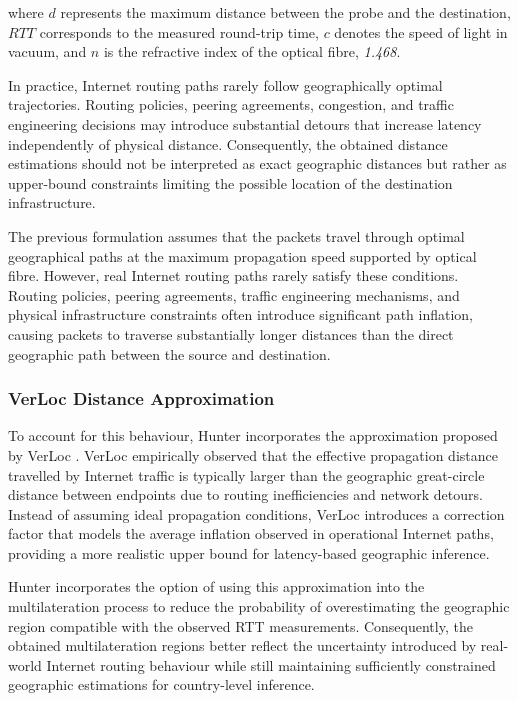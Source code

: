 \documentclass[
A4paper,                %
twoside,                %
openright,              %
chapterprefix=true,     %
12pt,                   %
headings=normal,        %
titlepage=on            %
]{book}
\begin{document}
where $d$ represents the maximum distance between the probe and the destination, $RTT$ corresponds to the measured round-trip time, $c$ denotes the speed of light in vacuum, and $n$ is the refractive index of the optical fibre, \textit{1.468}.

In practice, Internet routing paths rarely follow geographically optimal trajectories. Routing policies, peering agreements, congestion, and traffic engineering decisions may introduce substantial detours that increase latency independently of physical distance. Consequently, the obtained distance estimations should not be interpreted as exact geographic distances but rather as upper-bound constraints limiting the possible location of the destination infrastructure.

The previous formulation assumes that the packets travel through optimal geographical paths at the maximum propagation speed supported by optical fibre. However, real Internet routing paths rarely satisfy these conditions. Routing policies, peering agreements, traffic engineering mechanisms, and physical infrastructure constraints often introduce significant path inflation, causing packets to traverse substantially longer distances than the direct geographic path between the source and destination.

\subsubsection{VerLoc Distance Approximation}
\label{sc:hunter_multilateration_distance_estimation_verloc}

To account for this behaviour, Hunter incorporates the approximation proposed by VerLoc \cite{Kohls2022VerLoc:Systems}. VerLoc empirically observed that the effective propagation distance travelled by Internet traffic is typically larger than the geographic great-circle distance between endpoints due to routing inefficiencies and network detours. Instead of assuming ideal propagation conditions, VerLoc introduces a correction factor that models the average inflation observed in operational Internet paths, providing a more realistic upper bound for latency-based geographic inference.

Hunter incorporates the option of using this approximation into the multilateration process to reduce the probability of overestimating the geographic region compatible with the observed RTT measurements. Consequently, the obtained multilateration regions better reflect the uncertainty introduced by real-world Internet routing behaviour while still maintaining sufficiently constrained geographic estimations for country-level inference.
\end{document}
